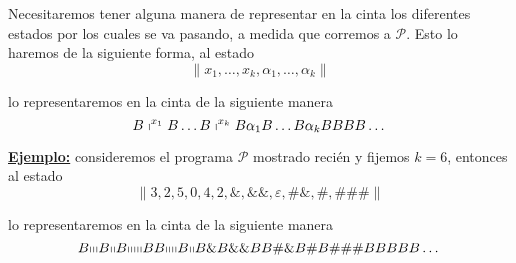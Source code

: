\begin{frame}
	\PN Necesitaremos tener alguna manera de representar en la cinta los diferentes estados por los cuales se va pasando,
	a medida que corremos a $\mathcal{P}$. Esto lo haremos de la siguiente forma, al estado
	\begin{equation*}
		\lVert x_{1}, \dotsc, x_{k}, \alpha_{1}, \dotsc, \alpha_{k} \rVert
	\end{equation*}

	\PN lo representaremos en la cinta de la siguiente manera
	\begin{equation*}
		B \shortmid^{x_{1}} B \dotsc B \shortmid^{x_{k}} B \alpha_{1} B \dotsc B \alpha_{k} BBBB \dotsc
	\end{equation*}

	\PN \underline{\textbf{Ejemplo:}} consideremos el programa $\mathcal{P}$ mostrado recién y fijemos $k=6$, entonces al
	estado
	\begin{equation*}
		\lVert 3, 2, 5, 0, 4, 2, \&, \&\&, \varepsilon, \#\&, \#, \#\#\# \rVert
	\end{equation*}

	\PN lo representaremos en la cinta de la siguiente manera
	\begin{equation*}
		B\mathrm{\shortmid \shortmid \shortmid} B \mathrm{\shortmid \shortmid} B\mathrm{\shortmid \shortmid \shortmid
		\shortmid \shortmid} BB \mathrm{\shortmid \shortmid \shortmid \shortmid} B \mathrm{\shortmid \shortmid} B \& B \&\&
		BB \#\& B \# B \#\#\# BBBBB \dotsc
	\end{equation*}
\end{frame}
